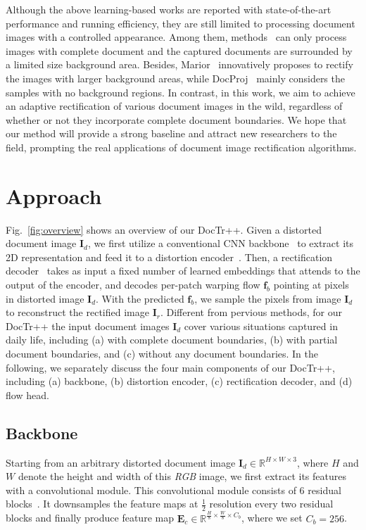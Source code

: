 \documentclass[lettersize,journal]{IEEEtran}
\begin{document}
Although the above learning-based works are reported with state-of-the-art performance and running efficiency,
they are still limited to processing document images with a controlled appearance.
Among them, methods~\cite{9010747,das2021end,feng2021doctr,jiang2022revisiting,liu2020geometric,8578592,xie2021document,xie2020dewarping,xue2022fourier,feng2021docscanner,feng2022geometric,markovitz2020can,li2019document,zhang2022marior,ma2022learning} can only process images with complete document and the captured documents are surrounded by a limited size background area.
Besides, Marior~\cite{zhang2022marior} innovatively proposes to rectify the images with larger background areas, while DocProj~\cite{li2019document} mainly considers the samples with no background regions.
In contrast, in this work, we aim to achieve an adaptive rectification of various document images in the wild, regardless of whether or not they incorporate complete document boundaries.
We hope that our method will provide a strong baseline and attract new researchers to the field, prompting the real applications of document image rectification algorithms.


\section{Approach}
Fig.~\ref{fig:overview} shows an overview of our DocTr++. 
Given a distorted document image $\bm{I}_d$,
we first utilize a conventional CNN backbone~\cite{he2016deep} to extract its 2D representation and feed it to a distortion encoder~\cite{Vaswani2017AttentionIA}.
Then, a rectification decoder~\cite{Vaswani2017AttentionIA} takes as input a fixed number of learned embeddings that attends to the output of the encoder,
and decodes per-patch warping flow $\bm{f}_b$ pointing at pixels in distorted image $\bm{I}_d$. With the predicted $\bm{f}_b$, we sample the pixels from image $\bm{I}_d$ to reconstruct the rectified image $\bm{I}_r$.
Different from pervious methods, for our DocTr++ the input document images $\bm{I}_d$ cover various situations captured in daily life, including (a) with complete document boundaries, (b) with partial document boundaries, and (c) without any document boundaries. 
In the following, we separately discuss the four main components of our DocTr++, including (a) backbone, (b) distortion encoder, (c) rectification decoder, and (d) flow head.

\subsection{Backbone}
Starting from an arbitrary distorted document image $\bm{I}_d \in\mathbb{R}^{H\times W\times3}$, where $H$ and $W$ denote the height and width of this \emph{RGB} image, we first extract its features with a convolutional module. This convolutional module consists of 6 residual blocks~\cite{he2016deep}. It downsamples the feature maps at $\frac{1}{2}$ resolution every two residual blocks and finally produce feature map $\bm{E}_{c} \in\mathbb{R}^{\frac{H}{8}\times\frac{W}{8}\times C_{b}}$, where we set $C_{b} = 256$.
                                                               
\end{document}
